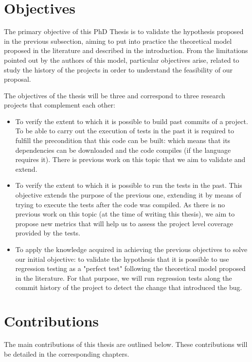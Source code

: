 \section{Objectives}

The primary objective of this PhD Thesis is to validate the hypothesis proposed in the previous subsection, aiming to put into practice the theoretical model proposed in the literature and described in the introduction. 
From the limitations pointed out by the authors of this model, particular objectives arise, related to study the history of the projects in order to understand the feasibility of our proposal.

The objectives of the thesis will be three and correspond to three research projects that complement each other:

\begin{itemize}
    \item To verify the extent to which it is possible to build past commits of a project. To be able to carry out the execution of tests in the past it is required to fulfill the precondition that this code can be built: which means that its dependencies can be downloaded and the code compiles (if the language requires it). 
    There is previous work on this topic that we aim to validate and extend.
    \item To verify the extent to which it is possible to run the tests in the past. This objective extends the purpose of the previous one, extending it by means of trying to execute the tests after the code was compiled. As there is no previous work on this topic (at the time of writing this thesis), we aim to propose new metrics that will help us to assess the project level coverage provided by the tests.
    \item To apply the knowledge acquired in achieving the previous objectives to solve our initial objective: to validate the hypothesis that it is possible to use regression testing as a "perfect test" following the theoretical model proposed in the literature.
    For that purpose, we will run regression tests along the commit history of the project to detect the change that introduced the bug.
\end{itemize}

\section{Contributions}

The main contributions of this thesis are outlined below.
These contributions will be detailed in the corresponding chapters.

